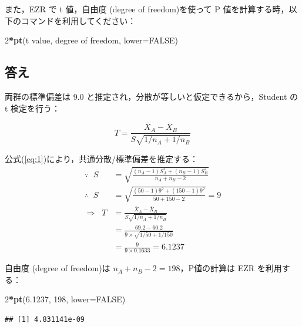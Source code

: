 \documentclass[11pt,]{problemset}
\newenvironment{Shaded}{\begin{snugshade}}{\end{snugshade}}
\newcommand{\DataTypeTok}[1]{\textcolor[rgb]{0.13,0.29,0.53}{#1}}
\newcommand{\DecValTok}[1]{\textcolor[rgb]{0.00,0.00,0.81}{#1}}
\newcommand{\FloatTok}[1]{\textcolor[rgb]{0.00,0.00,0.81}{#1}}
\newcommand{\KeywordTok}[1]{\textcolor[rgb]{0.13,0.29,0.53}{\textbf{#1}}}
\newcommand{\NormalTok}[1]{#1}
\newcommand{\OperatorTok}[1]{\textcolor[rgb]{0.81,0.36,0.00}{\textbf{#1}}}
\newcommand{\OtherTok}[1]{\textcolor[rgb]{0.56,0.35,0.01}{#1}}
\begin{document}
また，EZR で t 値，自由度 (degree of freedom)を使って P
値を計算する時，以下のコマンドを利用してください：

\begin{Shaded}
\begin{Highlighting}[]
\DecValTok{2}\OperatorTok{*}\KeywordTok{pt}\NormalTok{(t value, degree of freedom, }\DataTypeTok{lower=}\OtherTok{FALSE}\NormalTok{)}
\end{Highlighting}
\end{Shaded}

\newpage
\vfill

\subsection{答え}

両群の標準偏差は 9.0 と推定され，分散が等しいと仮定できるから，Student
の t 検定を行う：

\[
T = \frac{\bar{X}_A - \bar{X}_B}{S\sqrt{1/n_A + 1/n_B}}
\]

公式(\ref{eq:1})により，共通分散/標準偏差を推定する： \[
\begin{aligned}
\because\;\;  S & = \sqrt{\frac{(n_A - 1)S^2_A + (n_B - 1)S^2_B}{n_A + n_B -2}} \\
\therefore\;\; S & =  \sqrt{\frac{(50 - 1)9^2 + (150 - 1)9^2}{50 + 150 -2}} = 9 \\
\Rightarrow\;\; T & = \frac{\bar{X}_A - \bar{X}_B}{S\sqrt{1/n_A + 1/n_B}} \\ 
                  & = \frac{69.2 - 60.2}{9\times\sqrt{1/50 + 1/150}} \\ 
                  & = \frac{9}{9\times0.1633} = 6.1237
\end{aligned}
\]

自由度 (degree of freedom)は \(n_A + n_B -2 = 198\)，P値の計算は EZR
を利用する：

\begin{Shaded}
\begin{Highlighting}[]
\DecValTok{2}\OperatorTok{*}\KeywordTok{pt}\NormalTok{(}\FloatTok{6.1237}\NormalTok{, }\DecValTok{198}\NormalTok{, }\DataTypeTok{lower=}\OtherTok{FALSE}\NormalTok{)}
\end{Highlighting}
\end{Shaded}

\begin{verbatim}
## [1] 4.831141e-09
\end{verbatim}
\end{document}
